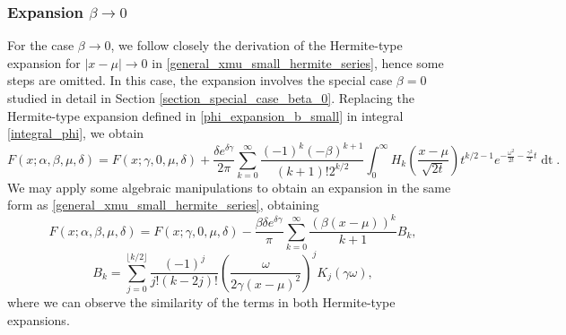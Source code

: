 \documentclass[10pt,a4paper,oneside]{article}
\numberwithin{equation}{section}
\begin{document}
\begin{table}[H]
	\centering
	\caption{Comparison on the number of terms to achieve machine precision with the three series expansions for $|x-\mu| \to 0$.}
	\label{table_xmu_general_n_terms}
\end{table}

\subsubsection{Expansion $\beta \to 0$} 
For the case $\beta \to 0$, we follow closely the derivation of the Hermite-type expansion for $|x-\mu| \to 0$ in \eqref{general_xmu_small_hermite_series}, hence some steps are omitted. In this case, the expansion involves the special case $\beta = 0$ studied in detail in Section \ref{section_special_case_beta_0}. Replacing the Hermite-type expansion defined in \eqref{phi_expansion_b_small} in integral \eqref{integral_phi}, we obtain
\begin{equation}
F(x; \alpha, \beta, \mu, \delta) = F(x; \gamma, 0, \mu, \delta) + \frac{\delta e^{\delta \gamma}}{2\pi} \sum_{k=0}^{\infty} \frac{(-1)^k (-\beta)^{k+1}}{(k+1)! 2^{k/2}} \int_0^{\infty} H_k\left(\frac{x-\mu}{\sqrt{2t}}\right) t^{k/2 - 1} e^{-\frac{\omega^2}{2t} - \frac{\gamma^2}{2}t} \mathop{dt}.
\end{equation}
We may apply some algebraic manipulations to obtain an expansion in the same form as \eqref{general_xmu_small_hermite_series}, obtaining
\begin{equation}\label{general_beta_small_hermite_series}
F(x; \alpha, \beta, \mu, \delta) = F(x; \gamma, 0, \mu, \delta) -\frac{\beta \delta e^{\delta \gamma}}{\pi}\sum_{k=0}^{\infty} \frac{(\beta(x-\mu))^k}{k+1}B_k,
\end{equation}
\begin{equation}
B_k = \sum_{j=0}^{\lfloor k/2 \rfloor} \frac{(-1)^j}{j!(k - 2j)!} \left(\frac{\omega}{2\gamma (x-\mu)^2}\right)^j K_{j}(\gamma \omega),
\end{equation}
where we can observe the similarity of the terms in both Hermite-type expansions.
\end{document}
